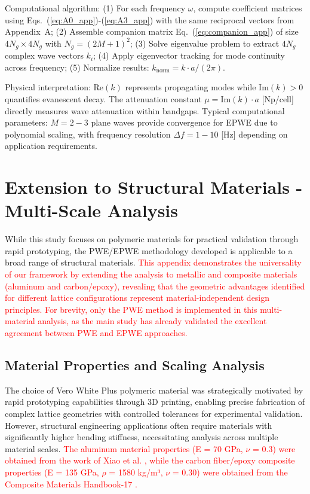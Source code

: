 \documentclass[review,numbers,sort&compress]{elsarticle}
\begin{document}
{Computational algorithm: (1) For each frequency $\omega$, compute coefficient matrices using Eqs.~(\ref{eq:A0_app})-(\ref{eq:A3_app}) with the same reciprocal vectors from Appendix~A; (2) Assemble companion matrix Eq.~(\ref{eq:companion_app}) of size $4N_g \times 4N_g$ with $N_g = (2M+1)^2$; (3) Solve eigenvalue problem to extract $4N_g$ complex wave vectors $k_i$; (4) Apply eigenvector tracking for mode continuity across frequency; (5) Normalize results: $k_{\text{norm}} = k \cdot a/(2\pi)$.

Physical interpretation: $\text{Re}(k)$ represents propagating modes while $\text{Im}(k) > 0$ quantifies evanescent decay. The attenuation constant $\mu = \text{Im}(k) \cdot a$ [Np/cell] directly measures wave attenuation within bandgaps. Typical computational parameters: $M = 2-3$ plane waves provide convergence for EPWE due to polynomial scaling, with frequency resolution $\Delta f = 1-10$ [Hz] depending on application requirements.


\newpage
\section{Extension to Structural Materials - Multi-Scale Analysis}\label{multi_material_analysis}

While this study focuses on polymeric materials for practical validation through rapid prototyping, the PWE/EPWE methodology developed is applicable to a broad range of structural materials. \textcolor{red}{This appendix demonstrates the universality of our framework by extending the analysis to metallic and composite materials (aluminum and carbon/epoxy), revealing that the geometric advantages identified for different lattice configurations represent material-independent design principles. For brevity, only the PWE method is implemented in this multi-material analysis, as the main study has already validated the excellent agreement between PWE and EPWE approaches.}

\subsection{Material Properties and Scaling Analysis}

The choice of Vero White Plus polymeric material was strategically motivated by rapid prototyping capabilities through 3D printing, enabling precise fabrication of complex lattice geometries with controlled tolerances for experimental validation. However, structural engineering applications often require materials with significantly higher bending stiffness, necessitating analysis across multiple material scales. \textcolor{red}{The aluminum material properties (E = 70 GPa, $\nu$ = 0.3) were obtained from the work of Xiao et al. \cite{Xiao_2012}, while the carbon fiber/epoxy composite properties (E = 135 GPa, $\rho$ = 1580 kg/m³, $\nu$ = 0.30) were obtained from the Composite Materials Handbook-17 \cite{CMH17_2012}.}

}
\end{document}
